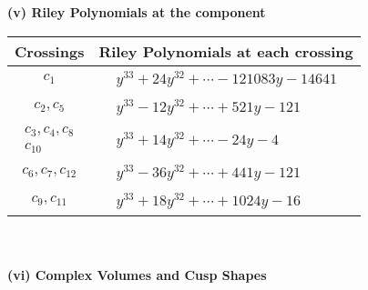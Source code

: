 \documentclass[1p]{elsarticle_modified}
\theoremstyle{definition}
\begin{document}
\newpage\renewcommand{\arraystretch}{1}
\flushleft \textbf{(v) Riley Polynomials at the component}\newline \\
\begin{tabular}{m{50pt}|m{274pt}}
Crossings & \hspace{64pt}Riley Polynomials at each crossing \\
\hline $$\begin{aligned}c_{1}\end{aligned}$$&$\begin{aligned}
&y^{33}+24 y^{32}+\cdots-121083 y-14641
\end{aligned}$\\
\hline $$\begin{aligned}c_{2},c_{5}\end{aligned}$$&$\begin{aligned}
&y^{33}-12 y^{32}+\cdots+521 y-121
\end{aligned}$\\
\hline $$\begin{aligned}c_{3},c_{4},c_{8}\\c_{10}\end{aligned}$$&$\begin{aligned}
&y^{33}+14 y^{32}+\cdots-24 y-4
\end{aligned}$\\
\hline $$\begin{aligned}c_{6},c_{7},c_{12}\end{aligned}$$&$\begin{aligned}
&y^{33}-36 y^{32}+\cdots+441 y-121
\end{aligned}$\\
\hline $$\begin{aligned}c_{9},c_{11}\end{aligned}$$&$\begin{aligned}
&y^{33}+18 y^{32}+\cdots+1024 y-16
\end{aligned}$\\
\hline
\end{tabular}\\~\\
\newpage\flushleft \textbf{(vi) Complex Volumes and Cusp Shapes}
\end{document}
